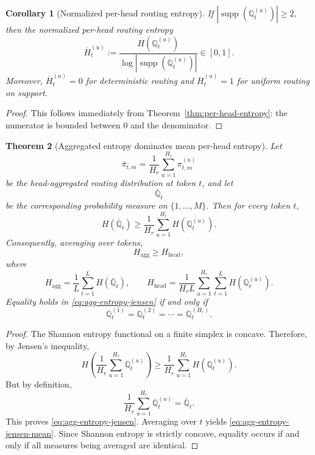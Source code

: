 \documentclass{article}
\theoremstyle{plain}
\newtheorem{theorem}{Theorem}[section]
\newtheorem{corollary}[theorem]{Corollary}
\theoremstyle{definition}
\theoremstyle{remark}
\begin{document}
\begin{corollary}[Normalized per-head routing entropy]
\label{cor:normalized-head-entropy}
If $\left|\operatorname{supp}\!\left(\mathbb{Q}^{(u)}_{t}\right)\right|\ge 2$, then the normalized per-head routing entropy
\begin{equation}
\label{eq:normalized-head-entropy}
\overline H^{(u)}_{t}
:=
\frac{H\!\left(\mathbb{Q}^{(u)}_{t}\right)}
{\log \left|\operatorname{supp}\!\left(\mathbb{Q}^{(u)}_{t}\right)\right|}
\in [0,1].
\end{equation}
Moreover, $\overline H^{(u)}_{t}=0$ for deterministic routing and $\overline H^{(u)}_{t}=1$ for uniform routing on support.
\end{corollary}

\begin{proof}
This follows immediately from Theorem~\ref{thm:per-head-entropy}: the numerator is bounded between $0$ and the denominator.
\end{proof}

\begin{theorem}[Aggregated entropy dominates mean per-head entropy]
\label{thm:aggregated-vs-head-entropy}
Let
\[
\bar{\pi}_{t,m}
=
\frac{1}{H_r}\sum_{u=1}^{H_r} \pi^{(u)}_{t,m}
\]
be the head-aggregated routing distribution at token $t$, and let
\[
\bar{\mathbb{Q}}_{t}
\]
be the corresponding probability measure on $\{1,\dots,M\}$. Then for every token $t$,
\begin{equation}
\label{eq:agg-entropy-jensen}
H(\bar{\mathbb{Q}}_{t})
\ge
\frac{1}{H_r}\sum_{u=1}^{H_r}
H\!\left(\mathbb{Q}^{(u)}_{t}\right).
\end{equation}
Consequently, averaging over tokens,
\begin{equation}
\label{eq:agg-entropy-jensen-mean}
    H_{\mathrm{agg}}
    \ge
    H_{\mathrm{head}},
    \end{equation}
    where
    \[
    H_{\mathrm{agg}}
    =
    \frac{1}{L}\sum_{t=1}^{L} H(\bar{\mathbb{Q}}_{t}),
    \qquad
    H_{\mathrm{head}}
    =
    \frac{1}{H_r L}\sum_{u=1}^{H_r}\sum_{t=1}^{L} H\!\left(\mathbb{Q}^{(u)}_{t}\right).
    \]
Equality holds in \eqref{eq:agg-entropy-jensen} if and only if
\[
\mathbb{Q}^{(1)}_{t}
=
\mathbb{Q}^{(2)}_{t}
=
\cdots
=
\mathbb{Q}^{(H_r)}_{t}.
\]
\end{theorem}

\begin{proof}
The Shannon entropy functional on a finite simplex is concave. Therefore, by Jensen's inequality,
\[
H\!\left(\frac{1}{H_r}\sum_{u=1}^{H_r}\mathbb{Q}^{(u)}_{t}\right)
\ge
\frac{1}{H_r}\sum_{u=1}^{H_r} H\!\left(\mathbb{Q}^{(u)}_{t}\right).
\]
But by definition,
\[
\frac{1}{H_r}\sum_{u=1}^{H_r}\mathbb{Q}^{(u)}_{t}
=
\bar{\mathbb{Q}}_{t}.
\]
This proves \eqref{eq:agg-entropy-jensen}. Averaging over $t$ yields \eqref{eq:agg-entropy-jensen-mean}. Since Shannon entropy is strictly concave, equality occurs if and only if all measures being averaged are identical.
\end{proof}
\end{document}
